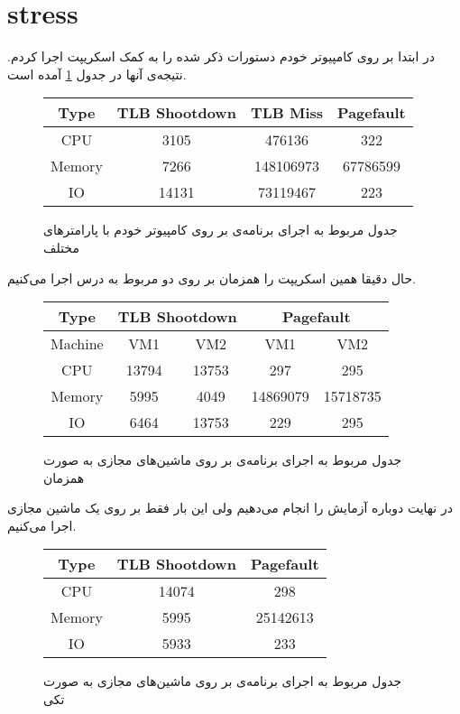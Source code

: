 \section{stress}
در ابتدا بر روی کامپیوتر خودم دستورات ذکر شده را به کمک اسکریپت
اجرا کردم. نتیجه‌ی آنها در جدول
\ref{table:bare_metal_stress}
آمده است.
\begin{figure}[H]
    \begin{latin}
        \centering
        \begin{tabular}{|c|ccc|}
        \hline
        Type & TLB Shootdown & TLB Miss & Pagefault\\
        \hline
        CPU & 3105 & 476136 & 322\\
        \hline
        Memory & 7266&148106973&67786599\\
        \hline
        IO & 14131 & 73119467 & 223\\
        \hline
        \end{tabular}
    \end{latin}
    \caption{جدول مربوط به اجرای برنامه‌ی  بر روی کامپیوتر خودم با پارامتر‌های مختلف}
    \label{table:bare_metal_stress}
\end{figure}
حال دقیقا همین اسکریپت را همزمان بر روی دو
مربوط به درس اجرا می‌کنیم.
\begin{figure}[H]
    \begin{latin}
        \centering
        \begin{tabular}{|c|cccc|}
        \hline
        Type & \multicolumn{2}{c}{TLB Shootdown} & \multicolumn{2}{c|}{Pagefault}\\
        \hline
        Machine & VM1 & VM2 & VM1 & VM2\\
        \hline
        CPU & 13794 & 13753 & 297 & 295\\
        \hline
        Memory & 5995 & 4049 & 14869079 & 15718735\\
        \hline
        IO & 6464 & 13753 & 229 & 295\\
        \hline
        \end{tabular}
    \end{latin}
    \caption{جدول مربوط به اجرای برنامه‌ی  بر روی ماشین‌های مجازی به صورت همزمان}
    \label{table:vm_stress}
\end{figure}
در نهایت دوباره آزمایش را انجام می‌دهیم ولی این بار فقط بر روی یک ماشین مجازی اجرا می‌کنیم.
\begin{figure}[H]
    \begin{latin}
        \centering
        \begin{tabular}{|c|cc|}
        \hline
        Type & TLB Shootdown & Pagefault\\
        \hline
        CPU & 14074 & 298\\
        \hline
        Memory & 5995 & 25142613\\
        \hline
        IO & 5933 & 233\\
        \hline
        \end{tabular}
    \end{latin}
    \caption{جدول مربوط به اجرای برنامه‌ی  بر روی ماشین‌های مجازی به صورت تکی}
    \label{table:vm_stress_single}
\end{figure}
